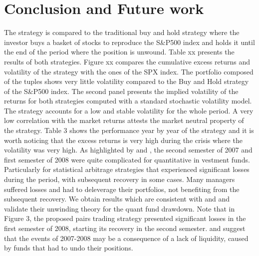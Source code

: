 \documentclass[11pt,a4,twosided,singlespacing,titlepagenumber=on]{scrreprt}
\numberwithin{equation}{chapter} %
\theoremstyle{remark}
\begin{document}
\chapter{Conclusion and Future work}

The strategy is compared to the traditional buy and hold strategy where the investor buys a basket of stocks to reproduce the S\&P500 index and holds it until the end of the period where the position is unwound. Table xx presents the results of both strategies. Figure xx compares the cumulative excess returns and volatility of the strategy with the ones of the SPX index. The portfolio composed of the tuples shows very little volatility compared to the Buy and Hold strategy of the S\&P500 index. The second panel presents the implied volatility of the returns for both strategies computed with a standard stochastic volatility model. The strategy accounts for a low and stable volatility for the whole period. A very low correlation with the market returns attests the market neutral property of the strategy. Table 3 shows the performance year by year of the strategy and it is worth noticing that the excess returns is very high during the crisis where the volatility was very high. As highlighted by \cite{khandani2007} and \cite{avellaneda2010}, the second semester of 2007 and first semester of 2008 were quite complicated for quantitative in vestment funds. Particularly for statistical arbitrage strategies that experienced significant losses during the period, with subsequent recovery in some cases. Many managers suffered losses and had to deleverage their portfolios, not benefiting from the subsequent recovery. We obtain results which are consistent with \cite{khandani2007} and \cite{avellaneda2010} and validate their unwinding theory for the quant fund drawdown. Note that in Figure 3, the proposed pairs trading strategy presented significant losses in the first semester of 2008, starting its recovery in the second semester. \cite{khandani2007} and \cite{avellaneda2010} suggest that the events of 2007-2008 may be a consequence of a lack of liquidity, caused by funds that had to undo their positions.
\end{document}
